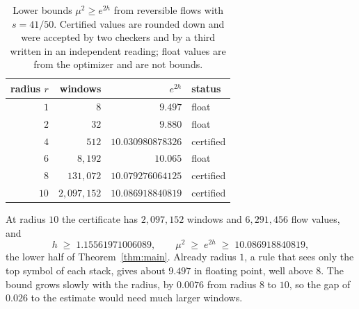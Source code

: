 \begin{table}[htb]
\centering
\begin{tabular}{rrrl}
\toprule
radius $r$ & windows & $e^{2h}$ & status\\
\midrule
$1$ & $8$ & $9.497$ & float\\
$2$ & $32$ & $9.880$ & float\\
$4$ & $512$ & $10.030980878326$ & certified\\
$6$ & $8{,}192$ & $10.065$ & float\\
$8$ & $131{,}072$ & $10.079276064125$ & certified\\
$10$ & $2{,}097{,}152$ & $\mathbf{10.086918840819}$ & certified\\
\bottomrule
\end{tabular}
\caption{Lower bounds $\mu^2\ge e^{2h}$ from reversible flows with $s=41/50$. Certified values are rounded down and
were accepted by two checkers and by a third written in an independent reading; float values are from the
optimizer and are not bounds.}
\label{tab:lower}
\end{table}

At radius $10$ the certificate has $2{,}097{,}152$ windows and $6{,}291{,}456$ flow values, and
\[ h\;\ge\;1.15561971006089,\qquad \mu^2\;\ge\;e^{2h}\;\ge\;10.086918840819, \]
the lower half of Theorem~\ref{thm:main}. Already radius $1$, a rule that sees only the top symbol of each stack,
gives about $9.497$ in floating point, well above $8$. The bound grows slowly with the radius, by $0.0076$ from radius $8$ to $10$, so the
gap of $0.026$ to the estimate would need much larger windows.
